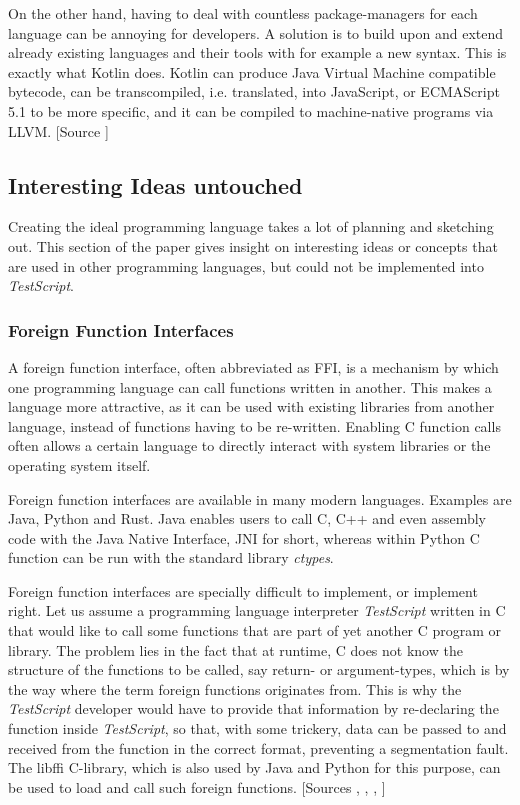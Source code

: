\documentclass[12pt,a4paper]{article}
\newcommand{\name}{\emph{TestScript}}
\begin{document}
On the other hand, having to deal with countless package-managers for each
language can be annoying for developers. A solution is to build upon and
extend already existing languages and their tools with for example a new syntax.
This is exactly what Kotlin does. Kotlin can produce Java Virtual Machine
compatible bytecode, can be transcompiled, i.e. translated, into
JavaScript, or ECMAScript 5.1 to be more specific,
and it can be compiled to machine-native programs via LLVM. 
[Source ]

\subsection{Interesting Ideas untouched}
Creating the ideal programming language takes a lot of planning and sketching
out. This section of the paper gives insight on interesting ideas or concepts
that are used in other programming languages, but 
could not be implemented into \name{}.

\subsubsection{Foreign Function Interfaces}
A foreign function interface, often abbreviated as FFI,
is a mechanism by which one programming language can call functions written 
in another. This makes a language more attractive, as it can be used with
existing libraries from another language, instead of functions having to be
re-written. Enabling C function calls often allows a certain language to
directly interact with system libraries or the operating system itself.

Foreign function interfaces are available in many modern languages.
Examples are Java, Python and Rust.
Java enables users to call C, C++ and even assembly code with the Java Native
Interface, JNI for short, whereas within Python C function can
be run with the standard library \emph{ctypes}.

Foreign function interfaces are specially difficult to implement, or implement
right. Let us assume a programming language interpreter \name{} written in C that
would like to call some functions that are part of yet another C program or
library. The problem lies in the fact that at runtime, C does not know the
structure of the functions to be called, say return- or argument-types, which
is by the way where the term foreign functions originates from. This is why the
\name{} developer would have to provide that information by re-declaring the
function inside \name{}, so that, with some trickery, data can be passed to and
received from the function in the correct format, preventing a segmentation
fault. The libffi C-library, which is also used by Java and
Python for this purpose, can be used to load and call such foreign functions.
[Sources , , , ]
\end{document}
